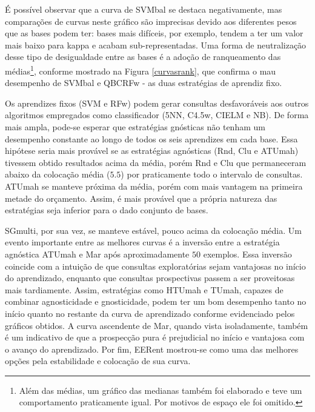 É possível observar que a curva de SVMbal se destaca negativamente,
mas comparações de curvas neste gráfico são imprecisas devido aos diferentes
pesos que as bases podem ter:
bases mais difíceis, por exemplo, tendem a ter um valor mais baixo para kappa e acabam
sub-representadas.
Uma forma de neutralização desse tipo de desigualdade entre as bases é a adoção
de ranqueamento das médias\footnote{Além das médias,
um gráfico das medianas também foi elaborado e teve um comportamento praticamente igual.
Por motivos de espaço ele foi omitido.}, conforme mostrado na Figura \ref{curvasrank},
que confirma o mau desempenho de SVMbal e QBCRFw - as duas estratégias de aprendiz fixo.

Os aprendizes fixos (SVM e RFw) podem gerar consultas desfavoráveis aos outros algoritmos
empregados como classificador (5NN, C4.5w, CIELM e NB).
De forma mais ampla, pode-se esperar que estratégias gnósticas não tenham um desempenho
constante ao longo de todos os seis aprendizes em cada base.
Essa hipótese seria mais provável se as estratégias agnósticas (Rnd, Clu e ATUmah) tivessem obtido
resultados acima da média, porém Rnd e Clu que permaneceram
abaixo da colocação média ($5.5$) por praticamente todo o intervalo de consultas.
ATUmah se manteve próxima da média, porém com mais vantagem na primeira metade do orçamento.
Assim, é mais provável que a própria natureza das estratégias seja inferior para o dado conjunto de bases.

SGmulti, por sua vez, se manteve estável, pouco acima da colocação média.
Um evento importante entre as melhores curvas é a inversão entre a estratégia agnóstica
ATUmah e Mar após aproximadamente $50$ exemplos.
Essa inversão coincide com a intuição de que consultas exploratórias sejam vantajosas
no início do aprendizado, enquanto que consultas prospectivas passem a ser proveitosas
mais tardiamente.
Assim, estratégias como HTUmah e TUmah, capazes de combinar agnosticidade e
gnosticidade, podem ter um bom desempenho tanto no início quanto no restante da
curva de aprendizado conforme evidenciado pelos gráficos obtidos.
A curva ascendente de Mar, quando vista isoladamente, também é um indicativo de
que a prospecção pura é prejudicial no início e vantajosa com o avanço do aprendizado.
Por fim, EERent mostrou-se como uma das melhores opções pela estabilidade e colocação
de sua curva.

